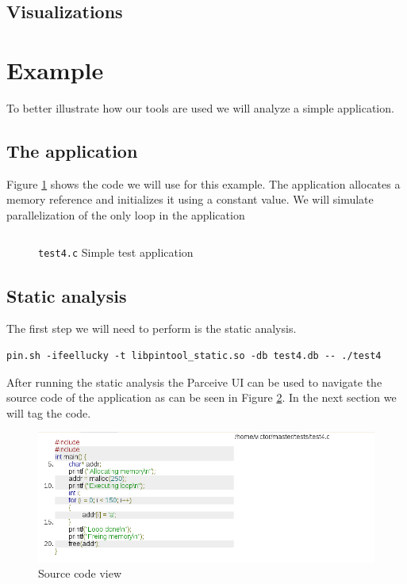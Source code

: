 \subsection {Visualizations}

\section {Example}

To better illustrate how our tools are used we will analyze a simple application.

\subsection{The application}

Figure \ref{cap1:example:code} shows the code we will use for this example. The application allocates a memory reference and initializes  it using a constant value. We will simulate parallelization of the only loop in the application

\begin{figure}
	\begin{center}
		\inputminted[linenos]{c}{../tests/test4.c}
	\end{center}
	\caption{\texttt{test4.c} Simple test application}
	\label{cap1:example:code}
\end{figure}

\subsection{Static analysis}

The first step we will need to perform is the static analysis.

\begin{lstlisting}[style=BashInputStyle]
pin.sh -ifeellucky -t libpintool_static.so -db test4.db -- ./test4
\end{lstlisting}

After running the static analysis the Parceive UI can be used to navigate the source code of the application as can be seen in Figure \ref{cap1:example:code-view}. In the next section we will tag the code.

\begin{figure}[!ht]
	\centering
	\includegraphics[width=1\textwidth]{simple-code}
	\caption{Source code view}
	\label{cap1:example:code-view}
\end{figure}

